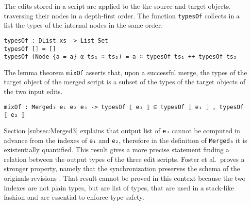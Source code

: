 \documentclass[../Thesis.tex]{subfiles}
\begin{document}
	The edits stored in a script are applied to the the source and 
	target objects, traversing their nodes in a depth-first order.
	The function \texttt{typesOf} collects in a list 
	the types of	the internal nodes in the same order.
	
\begin{verbatim}
typesOf : DList xs -> List Set
typesOf [] = []
typesOf (Node {a = a} α ts₁ ∷ ts₂) = a ∷ typesOf ts₁ ++ typesOf ts₂
\end{verbatim}

	The lemma theorem \texttt{mixOf} asserts that, upon a successful merge, 
	the types of the target object of the merged script
	is a subset of the types of the target objects of the two input edits.

\begin{verbatim}	
mixOf : Merged₃ e₁ e₂ e₃ -> typesOf ⟦ e₃ ⟧ ⊆ typesOf ⟦ e₁ ⟧ , typesOf ⟦ e₂ ⟧
\end{verbatim}

	Section \ref{subsec:Merged3} explains that output list of \texttt{e₃}
	cannot be computed in advance from the indexes of \texttt{e₁} and 
	\texttt{e₂}, therefore in the definition of \texttt{Merged₃} it is
	existentially quantified. This result gives a more precise statement 
	finding a relation between the output types of the three edit scripts.
	Foster et al.\ proves a stronger property, namely that the synchronization
	preserves the schema of the originals revisions \cite{Pierce07}.
	That result cannot be proved in this context because the two indexes
	are not plain types, but are list of types, that are used in a stack-like
	fashion and are essential to enforce type-safety.
	
\end{document}
